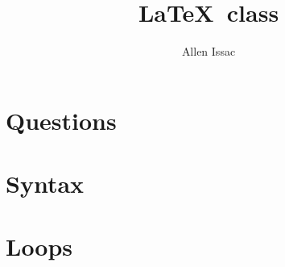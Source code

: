 \documentclass[9pt,a4paper,twoside]{tau-class/tau}
\title{\LaTeX\ class}
\author[a,1]{Allen Issac}
\affil[a]{Master of Science Physics}
\begin{document}
		
    \maketitle 
    \thispagestyle{firststyle} \tauabstract 
    \tableofcontents
    \linenumbers 
    
\section{Questions}
\section{Syntax}
\section{Loops}		
\end{document}
